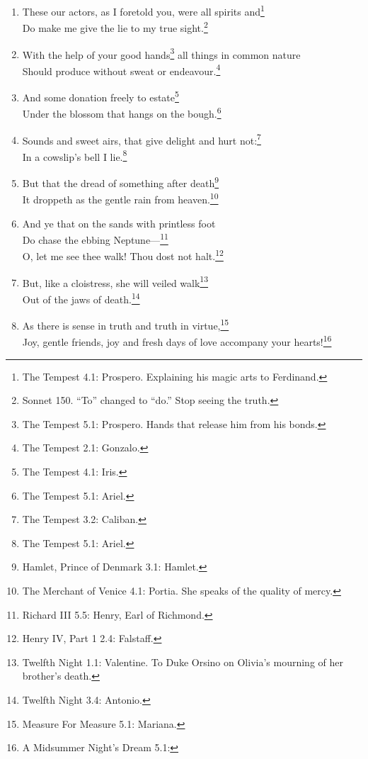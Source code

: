 \documentclass[17pt,twoside]{extarticle}
\begin{document}
\begin{enumerate}
{    retinue.}\\Merrily, merrily, shall I live now.\footnote{The Tempest
    5.1: Ariel. On learning he will soon be freed from his service to
    Prospero.}
\item
  These our actors, as I foretold you, were all spirits and\footnote{The
    Tempest 4.1: Prospero. Explaining his magic arts to Ferdinand.}\\Do
  make me give the lie to my true sight.\footnote{Sonnet 150. ``To''
    changed to ``do.'' Stop seeing the truth.}
\item
  With the help of your good hands\footnote{The Tempest 5.1: Prospero.
    Hands that release him from his bonds.} all things in common
  nature\\Should produce without sweat or endeavour.\footnote{The
    Tempest 2.1: Gonzalo.}
\item
  And some donation freely to estate\footnote{The Tempest 4.1: Iris.}\\Under
  the blossom that hangs on the bough.\footnote{The Tempest 5.1: Ariel.}
\item
  Sounds and sweet airs, that give delight and hurt not:\footnote{The
    Tempest 3.2: Caliban.}\\In a cowslip's bell I lie.\footnote{The
    Tempest 5.1: Ariel.}
\item
  But that the dread of something after death\footnote{Hamlet, Prince of
    Denmark 3.1: Hamlet.}\\It droppeth as the gentle rain from
  heaven.\footnote{The Merchant of Venice 4.1: Portia. She speaks of the
    quality of mercy.}
\item
  And ye that on the sands with printless foot\\Do chase the ebbing
  Neptune---\footnote{Richard III 5.5: Henry, Earl of Richmond.}\\O, let
  me see thee walk! Thou dost not halt.\footnote{Henry IV, Part 1 2.4:
    Falstaff.}
\item
  But, like a cloistress, she will veiled walk\footnote{Twelfth Night
    1.1: Valentine. To Duke Orsino on Olivia's mourning of her brother's
    death.}\\Out of the jaws of death.\footnote{Twelfth Night 3.4:
    Antonio.}
\item
  As there is sense in truth and truth in virtue,\footnote{Measure For
    Measure 5.1: Mariana.}\\Joy, gentle friends, joy and fresh days of
  love accompany your hearts!\footnote{A Midsummer Night's Dream 5.1:
}
\end{enumerate}
\end{document}
